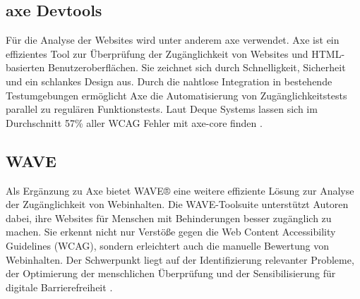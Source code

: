 \subsection{axe Devtools}
Für die Analyse der Websites wird unter anderem axe verwendet. Axe ist ein effizientes Tool zur Überprüfung der Zugänglichkeit von Websites und HTML-basierten Benutzeroberflächen. Sie zeichnet sich durch Schnelligkeit, Sicherheit und ein schlankes Design aus. Durch die nahtlose Integration in bestehende Testumgebungen ermöglicht Axe die Automatisierung von Zugänglichkeitstests parallel zu regulären Funktionstests. Laut Deque Systems lassen sich im Durchschnitt 57\% aller WCAG Fehler mit axe-core finden \parencite[vgl.][]{dequelabs_axedevtools_2025}. 

\subsection{WAVE}
Als Ergänzung zu Axe bietet WAVE® eine weitere effiziente Lösung zur Analyse der Zugänglichkeit von Webinhalten. Die WAVE-Toolsuite unterstützt Autoren dabei, ihre Websites für Menschen mit Behinderungen besser zugänglich zu machen. Sie erkennt nicht nur Verstöße gegen die Web Content Accessibility Guidelines (WCAG), sondern erleichtert auch die manuelle Bewertung von Webinhalten. Der Schwerpunkt liegt auf der Identifizierung relevanter Probleme, der Optimierung der menschlichen Überprüfung und der Sensibilisierung für digitale Barrierefreiheit \parencite[vgl.][]{webaim_wave_nodate}.
